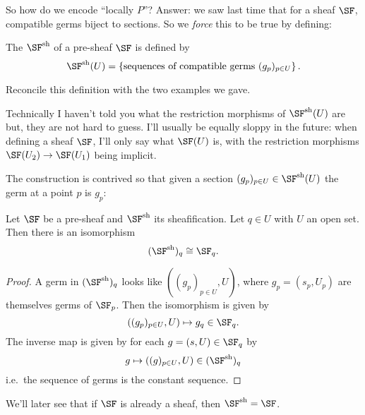 \documentclass[11pt]{scrreprt}
\begin{document}
So how do we encode ``locally $P$''?
Answer: we saw last time that for a sheaf $\SF$,
compatible germs biject to sections.
So we \emph{force} this to be true by defining:
\begin{definition}
	The  $\SF\sh$ of a pre-sheaf $\SF$ is defined by
	\[ \SF\sh(U) =
		\left\{ \text{sequences of compatible
		germs $(g_p)_{p \in U}$} \right\}.  \]
\end{definition}
\begin{exercise}
	Reconcile this definition with the two examples we gave.
\end{exercise}
\begin{abuse}
	Technically I haven't told you what the restriction morphisms
	of $\SF\sh(U)$ are but, they are not hard to guess.
	I'll usually be equally sloppy in the future:
	when defining a sheaf $\SF$, I'll only say what $\SF(U)$ is,
	with the restriction morphisms $\SF(U_2) \to \SF(U_1)$ being implicit.
\end{abuse}
The construction is contrived so that given a section
$(g_p)_{p \in U} \in \SF\sh(U)$ the germ at a point $p$ is $g_p$:
\begin{lemma}
	\label{lem:pre_sheaf_stalk}
	Let $\SF$ be a pre-sheaf and $\SF\sh$ its sheafification.
	Let $q \in U$ with $U$ an open set.
	Then there is an isomorphism
	\[ (\SF\sh)_q \cong \SF_q. \]
\end{lemma}
\begin{proof}
	A germ in $(\SF\sh)_q$ looks like 
	$\left( (g_p)_{p \in U}, U \right)$,
	where $g_p = (s_p, U_p)$ are themselves germs of $\SF_p$.
	Then the isomorphism is given by
	\[ \left( (g_p)_{p \in U}, U \right) \mapsto g_q \in \SF_q. \]
	The inverse map is given by for each $g = (s,U) \in \SF_q$ by
	\[ g \mapsto \left( (g)_{p \in U}, U \right) \in (\SF\sh)_q \]
	i.e.\ the sequence of germs is the constant sequence.
\end{proof}

We'll later see that if $\SF$ is already a sheaf, then $\SF\sh = \SF$.
\end{document}
